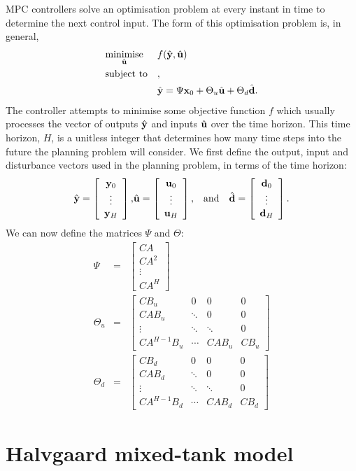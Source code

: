 MPC controllers solve an optimisation problem at every instant in time to determine the next control input.
The form of this optimisation problem is, in general,
\begin{equation}
	\label{eq:mpc-opt}
	\optimise
		{minimise}{\hvec{u}}
		{f(\hvec{y}, \hvec{u})}
		{\hvec{y} = \Psi \vec{x}_0 + \Theta_u \hvec{u} + \Theta_d \hvec{d}}
\end{equation}
The controller attempts to minimise some objective function $f$ which usually processes the vector of outputs $\hat{\mathbf{y}}$ and inputs $\hat{\mathbf{u}}$ over the time horizon.
This time horizon, $H$, is a unitless integer that determines how many time steps into the future the planning problem will consider.
We first define the output, input and disturbance vectors used in the planning problem, in terms of the time horizon:
\begin{eqnarray}
	\label{eq:mpc-vectors}
	\hat{\mathbf{y}} = \left[\begin{array}{c}
		\mathbf{y}_0 \\
		\vdots \\
		\mathbf{y}_H
	\end{array}\right],
	&
	\hat{\mathbf{u}} = \left[\begin{array}{c}
		\mathbf{u}_0 \\
		\vdots \\
		\mathbf{u}_H
	\end{array}\right],
	&
	\text{and}\quad \hat{\mathbf{d}} = \left[\begin{array}{c}
		\mathbf{d}_0 \\
		\vdots \\
		\mathbf{d}_H
	\end{array}\right].
\end{eqnarray}
We can now define the matrices $\Psi$ and $\Theta$:
\begin{eqnarray}
	\label{eq:mpc-psi}
	\Psi &=& \left[\begin{array}{c}
		CA \\ CA^2 \\ \vdots \\ CA^H
	\end{array}\right]
	\\\label{eq:mpc-theta-u}
	\Theta_u &=& \left[\begin{array}{cccc}
		CB_u & 0 & 0 & 0 \\
		CAB_u & \ddots & 0 & 0 \\
		\vdots & \ddots & \ddots & 0 \\
		CA^{H-1}B_u & \cdots & CAB_u & CB_u
	\end{array}\right]
	\\\label{eq:mpc-theta-d}
	\Theta_d &=& \left[\begin{array}{cccc}
		CB_d & 0 & 0 & 0 \\
		CAB_d & \ddots & 0 & 0 \\
		\vdots & \ddots & \ddots & 0 \\
		CA^{H-1}B_d & \cdots & CAB_d & CB_d
	\end{array}\right]
\end{eqnarray}

\section{Halvgaard mixed-tank model}
\label{sec:model:halvgaard}


